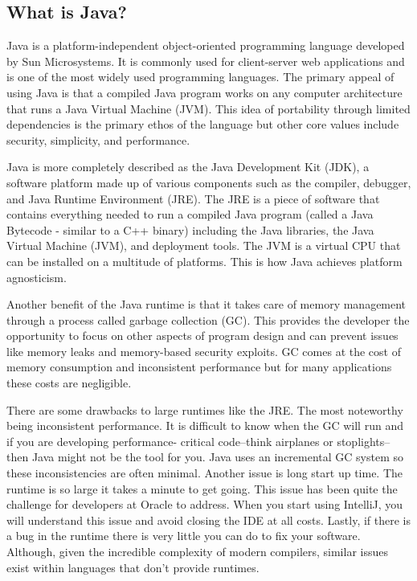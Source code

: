 \documentclass[../../main.tex]{subfiles}
\begin{document}
\subsection{What is Java?}
Java is a platform-independent object-oriented programming language developed by Sun Microsystems.
It is commonly used for client-server web applications and is one of the most widely used
programming languages. The primary appeal of using Java is that a compiled Java program works on
any computer architecture that runs a Java Virtual Machine (JVM). This idea of portability through
limited dependencies is the primary ethos of the language but other core values include security,
simplicity, and performance.

\vspace{1em}
Java is more completely described as the Java Development Kit (JDK), a software platform made up of
various components such as the compiler, debugger, and Java Runtime Environment (JRE). The JRE is
a piece of software that contains everything needed to run a compiled Java program (called a Java
Bytecode - similar to a C++ binary) including the Java libraries, the Java Virtual Machine (JVM),
and deployment tools. The JVM is a virtual CPU that can be installed on a multitude of platforms.
This is how Java achieves platform agnosticism.

\vspace{1em}
Another benefit of the Java runtime is that it takes care of memory management through a process
called garbage collection (GC). This provides the developer the opportunity to focus on other
aspects of program design and can prevent issues like memory leaks and memory-based security
exploits. GC comes at the cost of memory consumption and inconsistent performance but for many
applications these costs are negligible.

\vspace{1em}
There are some drawbacks to large runtimes like the JRE. The most noteworthy being inconsistent
performance. It is difficult to know when the GC will run and if you are developing performance-
critical code--think airplanes or stoplights--then Java might not be the tool for you. Java uses
an incremental GC system so these inconsistencies are often minimal. Another issue is long
start up time. The runtime is so large it takes a minute to get going. This issue has been quite
the challenge for developers at Oracle to address. When you start using IntelliJ, you will
understand this issue and avoid closing the IDE at all costs. Lastly, if there is a bug in the
runtime there is very little you can do to fix your software. Although, given the incredible
complexity of modern compilers, similar issues exist within languages that don't provide runtimes.
\end{document}
